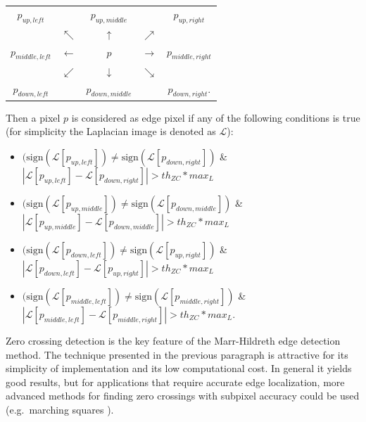 \documentclass{ipol}
\numberwithin{equation}{section}
\numberwithin{table}{section}
\begin{document}
\begin{center}
\begin{tabular}{ c c c c c }
	$p_{up,left}$		& 					& $p_{up,middle}$	&					& $p_{up,right}$ 		\\
						& $\nwarrow$		& $\uparrow$		& $\nearrow$		&						\\
	$p_{middle,left}$	& $\leftarrow$		& $p$				& $\rightarrow$		& $p_{middle,right}$	\\
						& $\swarrow$		& $\downarrow$		& $\searrow$		&						\\
	$p_{down,left}$		&					& $p_{down,middle}$	&					& $p_{down,right}$.		\\  
\end{tabular}
\end{center}

Then a pixel $p$ is considered as edge pixel if any of the following conditions is true 
(for simplicity the Laplacian image is denoted as $\mathcal{L}$):
\begin{itemize}
	\item $(\mbox{sign}(\mathcal{L}[p_{up,left}])\neq\mbox{sign}(\mathcal{L}[p_{down,right}])$ \& $|\mathcal{L}[p_{up,left}]-\mathcal{L}[p_{down,right}]|>th_{ZC}*max_L$
	\item $(\mbox{sign}(\mathcal{L}[p_{up,middle}])\neq\mbox{sign}(\mathcal{L}[p_{down,middle}])$ \& $|\mathcal{L}[p_{up,middle}]-\mathcal{L}[p_{down,middle}]|>th_{ZC}*max_L$
	\item $(\mbox{sign}(\mathcal{L}[p_{down,left}])\neq\mbox{sign}(\mathcal{L}[p_{up,right}])$ \& $|\mathcal{L}[p_{down,left}]-\mathcal{L}[p_{up,right}]|>th_{ZC}*max_L$
	\item $(\mbox{sign}(\mathcal{L}[p_{middle,left}])\neq\mbox{sign}(\mathcal{L}[p_{middle,right}])$ \& $|\mathcal{L}[p_{middle,left}]-\mathcal{L}[p_{middle,right}]|>th_{ZC}*max_L$. \\
\end{itemize}

Zero crossing detection is the key feature of the Marr-Hildreth edge detection method. The technique 
presented in the previous paragraph is attractive for its simplicity of implementation and its low 
computational cost. In general it yields good results, but for applications that require accurate edge localization, more advanced methods for finding zero crossings with subpixel 
accuracy could be used (e.g.\ marching squares \cite{comp_graph:surf_recon:lorensen:87:marching_cubes}).

\end{document}
